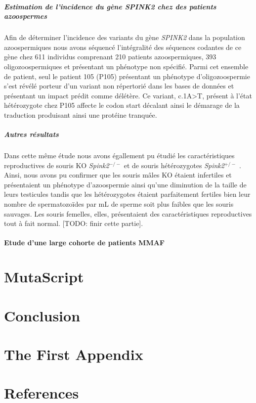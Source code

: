 \documentclass[12pt,twoside]{reedthesis}
\theoremstyle{definition}
\theoremstyle{definition}
\theoremstyle{remark}
\begin{document}
  \paragraph{\texorpdfstring{Estimation de l'incidence du gène
  \emph{SPINK2} chez des patients
  azoospermes}{Estimation de l'incidence du gène SPINK2 chez des patients azoospermes}}\label{estimation-de-lincidence-du-gene-spink2-chez-des-patients-azoospermes}
  
  Afin de déterminer l'incidence des variants du gène \emph{SPINK2} dans
  la population azoospermiques nous avons séquencé l'intégralité des
  séquences codantes de ce gène chez 611 individus comprenant 210 patients
  azoospermiques, 393 oligozoospermiques et présentant un phénotype non
  spécifié. Parmi cet ensemble de patient, seul le patient 105 (P105)
  présentant un phénotype d'oligozoospermie s'est révélé porteur d'un
  variant non répertorié dans les bases de données et présentant un impact
  prédit comme délétère. Ce variant, c.1A\textgreater{}T, présent à l'état
  hétérozygote chez P105 affecte le codon start décalant ainsi le démarage
  de la traduction produisant ainsi une protéine tranquée.
  
  \paragraph{Autres résultats}\label{autres-resultats}
  
  Dans cette même étude nous avons égallement pu étudié les
  caractéristiques reproductives de souris KO \emph{Spink2}\(^{-/-}\) et
  de souris hétérozygotes \emph{Spink2}\(^{+/-}\) . Ainsi, nous avons pu
  confirmer que les souris mâles KO étaient infertiles et présentaient un
  phénotype d'azoospermie ainsi qu'une diminution de la taille de leurs
  testicules tandis que les hétérozygotes étaient parfaitement fertiles
  bien leur nombre de spermatozoïdes par mL de sperme soit plus faibles
  que les souris sauvages. Les souris femelles, elles, présentaient des
  caractéristiques reproductives tout à fait normal. {[}TODO: finir cette
  partie{]}.
  
  \newpage  
  
  \hypertarget{cohortemmah}{\subsubsection{Etude d'une large cohorte de
  patients MMAF}\label{cohortemmah}}
  
  \chapter{MutaScript}\label{mutascript}
  
  \chapter*{Conclusion}\label{conclusion}
  
  \chapter{The First Appendix}\label{the-first-appendix}
  
  \chapter*{References}\label{references}


\end{document}
